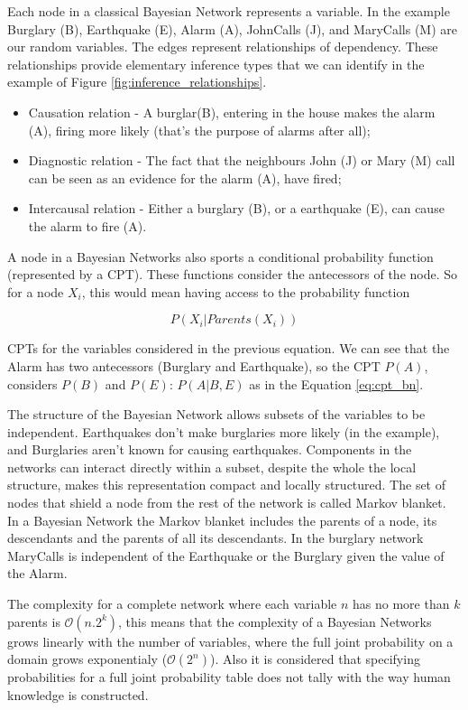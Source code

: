 Each node in a classical Bayesian Network represents a variable. In the example Burglary (B), Earthquake (E), Alarm (A), JohnCalls (J), and MaryCalls (M) are our random variables.
The edges represent relationships of dependency. These relationships provide elementary inference types that we can identify in the example of Figure \ref{fig:inference_relationships}. 
\begin{itemize}
\item Causation relation - A burglar(B), entering in the house makes the alarm (A), firing more likely (that's the purpose of alarms after all);
\item Diagnostic relation - The fact that the neighbours John (J) or Mary (M) call can be seen as an evidence for the alarm (A), have fired;
\item Intercausal relation - Either a burglary (B), or a earthquake (E), can cause the alarm to fire (A).
\end{itemize}

A node in a Bayesian Networks also sports a conditional probability function (represented by a \ac{CPT}). These functions consider the antecessors of the node. So for a node $X_{i}$, this would mean having access to the probability function 

\begin{equation}
\label{eq:cpt_bn}
P(X_{i} \vert Parents(X_{i} ))
\end{equation}

\ac{CPT}s for the variables considered in the previous equation. We can see that the Alarm has two antecessors (Burglary and Earthquake), so the \ac{CPT} $P(A)$, considers $P(B)$ and $P(E)$:  $P(A \vert B, E)$ as in the Equation \eqref{eq:cpt_bn}. 

The structure of the Bayesian Network allows subsets of the variables to be independent. Earthquakes don't make burglaries more likely (in the example), and Burglaries aren't known for causing earthquakes. 
Components in the networks can interact directly within a subset, despite the whole the local structure, makes this representation compact and locally structured. The set of nodes that shield a node from the rest of the network is called Markov blanket\cite{Pearl1988}. In a Bayesian Network the Markov blanket includes the parents of a node, its descendants and the parents of all its descendants. In the burglary network MaryCalls is independent of the Earthquake or the Burglary given the value of the Alarm. 

The complexity for a complete network where each variable $n$ has no more than $k$ parents is $\mathcal{O}(n.2^{k})$, this means that the complexity of a Bayesian Networks grows linearly with the number of variables, where the full joint probability on a domain grows exponentialy ($\mathcal{O}(2^{n})$). Also it is considered \cite{Pearl1985} \cite{Norvig2003} that specifying probabilities for a full joint probability table does not tally with the way human knowledge is constructed.

